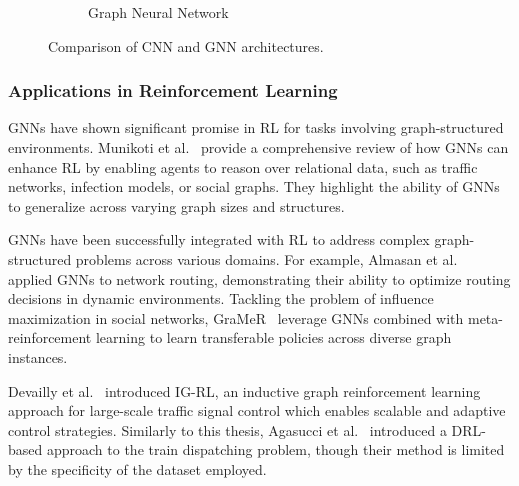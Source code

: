 \documentclass[runningheads]{llncs}
\begin{document}
\begin{figure}[htbp]
\begin{subfigure}[b]{0.45\textwidth}
        \caption{Graph Neural Network}
    \end{subfigure}
    \caption{Comparison of CNN and GNN architectures.}
    \label{fig:cnn_vs_gnn}
\end{figure}


\subsubsection{Applications in Reinforcement Learning}
GNNs have shown significant promise in RL for tasks involving graph-structured environments. 
Munikoti et al.~\cite{gnndrl:munikoti2022challengesopportunitiesdeepreinforcement} provide a comprehensive review of how GNNs can enhance RL by enabling agents to reason over relational data, such as traffic networks, infection models, or social graphs. 
They highlight the ability of GNNs to generalize across varying graph sizes and structures.

GNNs have been successfully integrated with RL to address complex graph-structured problems across various domains. 
For example, Almasan et al.~\cite{gnndrl:ALMASAN2022184} applied GNNs to network routing, demonstrating their ability to optimize routing decisions in dynamic environments.
Tackling the problem of influence maximization in social networks, GraMeR~\cite{gnndrl:munikoti2022gramergraphmetareinforcement} leverage GNNs combined with meta-reinforcement learning to learn transferable policies across diverse graph instances.

Devailly et al.~\cite{gnndrl:Devailly_2022} introduced IG-RL, an inductive graph reinforcement learning approach for large-scale traffic signal control which enables scalable and adaptive control strategies. 
Similarly to this thesis, Agasucci et al.~\cite{gnndrl:agasucci} introduced a DRL-based approach to the train dispatching problem, though their method is limited by the specificity of the dataset employed.
\end{document}
